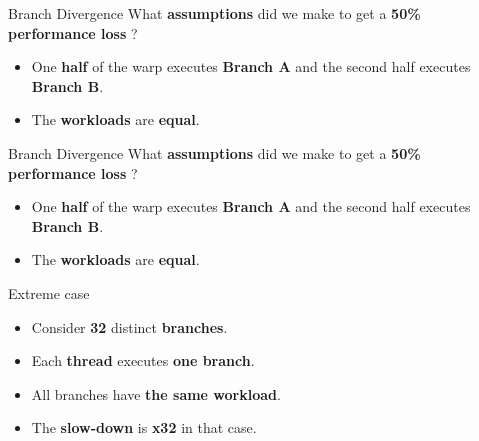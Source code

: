 \documentclass[9pt]{beamer}
\newcommand{\emphasize}[1]{\textbf{\color{red} #1 } }
\begin{document}
\begin{frame}[t]{Branch Divergence }
What \textbf{assumptions} did we make to get a \emphasize{50\% performance loss}?
\begin{itemize}
	\item One \textbf{half} of the warp executes \textbf{Branch A} and the second half executes \\ \textbf{Branch B}.
\item The \textbf{workloads} are \textbf{equal}.
\end{itemize}
\end{frame}


\begin{frame}[t]{Branch Divergence }
What \textbf{assumptions} did we make to get a \emphasize{50\% performance loss}?
\begin{itemize}
	\item One \textbf{half} of the warp executes \textbf{Branch A} and the second half executes \\ \textbf{Branch B}.
	\item The \textbf{workloads} are \textbf{equal}.
\end{itemize}

\begin{alertblock}{Extreme case}
\begin{itemize}
\item Consider \textbf{32} distinct \textbf{branches}.
\item Each \textbf{thread} executes \textbf{one branch}.
\item All branches have \textbf{the same workload}.
\item The \textbf{slow-down} is \textbf{x32} in that case.
\end{itemize}

\end{alertblock}
\end{frame}
\end{document}
